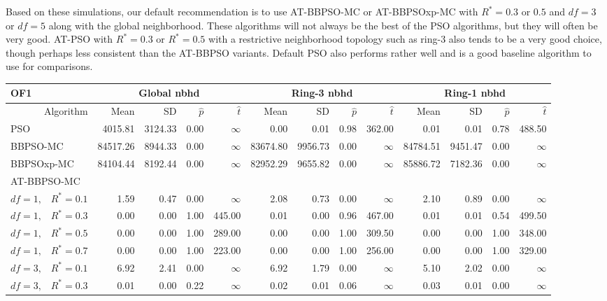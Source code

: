 \documentclass[cmbright]{staauth}
\begin{document}
Based on these simulations, our default recommendation is to use AT-BBPSO-MC or AT-BBPSOxp-MC with $R^*=0.3$ or $0.5$ and $df=3$ or $df=5$ along with the global neighborhood. These algorithms will not always be the best of the PSO algorithms, but they will often be very good. AT-PSO with $R^*=0.3$ or $R^*=0.5$ with a restrictive neighborhood topology such as ring-3 also tends to be a very good choice, though perhaps less consistent than the AT-BBPSO variants. Default PSO also performs rather well and is a good baseline algorithm to use for comparisons.


\begin{table}[ht]
\centering
\tiny{
\begin{tabular}{r|rrrr|rrrr|rrrr}
\multicolumn{1}{l}{OF1} & \multicolumn{4}{c}{Global nbhd} & \multicolumn{4}{c}{Ring-3 nbhd} & \multicolumn{4}{c}{Ring-1 nbhd}\\
\hline
Algorithm & Mean & SD & $\widehat{p}$ & $\widehat{t}$ & Mean & SD & $\widehat{p}$ & $\widehat{t}$ & Mean & SD & $\widehat{p}$ & $\widehat{t}$ \\
  \hline
\multicolumn{1}{l|}{PSO} & 4015.81 & 3124.33 & 0.00 & $\infty$ & 0.00 & 0.01 & 0.98 & 362.00 & 0.01 & 0.01 & 0.78 & 488.50 \\
  \multicolumn{1}{l|}{BBPSO-MC} & 84517.26 & 8944.33 & 0.00 & $\infty$ & 83674.80 & 9956.73 & 0.00 & $\infty$ & 84784.51 & 9451.47 & 0.00 & $\infty$ \\
  \multicolumn{1}{l|}{BBPSOxp-MC} & 84104.44 & 8192.44 & 0.00 & $\infty$ & 82952.29 & 9655.82 & 0.00 & $\infty$ & 85886.72 & 7182.36 & 0.00 & $\infty$ \\
\hline
\multicolumn{1}{l|}{AT-BBPSO-MC} &&&&&&&&&&&&\\
  $df = 1,\enspace$ $R^* =0.1$ & 1.59 & 0.47 & 0.00 & $\infty$ & 2.08 & 0.73 & 0.00 & $\infty$ & 2.10 & 0.89 & 0.00 & $\infty$ \\
  $df = 1,\enspace$ $R^* =0.3$ & 0.00 & 0.00 & 1.00 & 445.00 & 0.01 & 0.00 & 0.96 & 467.00 & 0.01 & 0.01 & 0.54 & 499.50 \\
  $df = 1,\enspace$ $R^* =0.5$ & 0.00 & 0.00 & 1.00 & 289.00 & 0.00 & 0.00 & 1.00 & 309.50 & 0.00 & 0.00 & 1.00 & 348.00 \\
  $df = 1,\enspace$ $R^* =0.7$ & 0.00 & 0.00 & 1.00 & 223.00 & 0.00 & 0.00 & 1.00 & 256.00 & 0.00 & 0.00 & 1.00 & 329.00 \\
  $df = 3,\enspace$ $R^* =0.1$ & 6.92 & 2.41 & 0.00 & $\infty$ & 6.92 & 1.79 & 0.00 & $\infty$ & 5.10 & 2.02 & 0.00 & $\infty$ \\
  $df = 3,\enspace$ $R^* =0.3$ & 0.01 & 0.00 & 0.22 & $\infty$ & 0.02 & 0.01 & 0.06 & $\infty$ & 0.03 & 0.01 & 0.00 & $\infty$ \\

\end{tabular}}
\end{table}
\end{document}

